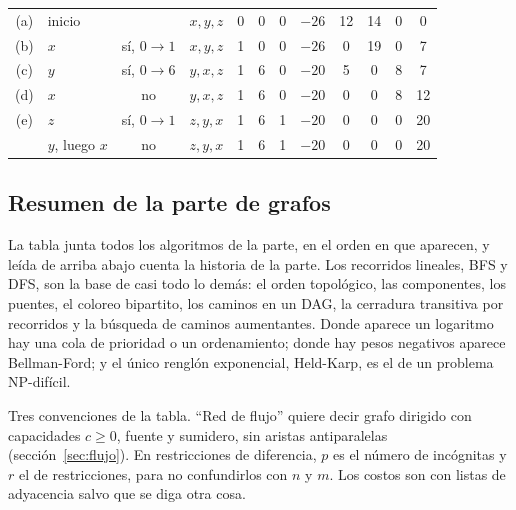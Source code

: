 \documentclass[11pt,letterpaper]{article}
\begin{document}
\begin{ejemplo}
\begin{center}
\begin{tabular}{clcccccccccc}
    \midrule
    (a) & inicio & & $x, y, z$ & 0 & 0 & 0 & $-26$ & 12 & 14 & 0 & 0 \\
    (b) & $x$ & sí, $0 \to 1$ & $x, y, z$ & 1 & 0 & 0 & $-26$ & 0 & 19
        & 0 & 7 \\
    (c) & $y$ & sí, $0 \to 6$ & $y, x, z$ & 1 & 6 & 0 & $-20$ & 5 & 0
        & 8 & 7 \\
    (d) & $x$ & no & $y, x, z$ & 1 & 6 & 0 & $-20$ & 0 & 0 & 8 & 12 \\
    (e) & $z$ & sí, $0 \to 1$ & $z, y, x$ & 1 & 6 & 1 & $-20$ & 0 & 0
        & 0 & 20 \\
    & $y$, luego $x$ & no & $z, y, x$ & 1 & 6 & 1 & $-20$ & 0 & 0 & 0
        & 20 \\
    \bottomrule
  \end{tabular}
  \end{center}
\end{ejemplo}


\subsection*{Resumen de la parte de grafos}

La tabla junta todos los algoritmos de la parte, en el orden en que
aparecen, y leída de arriba abajo cuenta la historia de la parte. Los
recorridos lineales, BFS y DFS, son la base de casi todo lo demás: el
orden topológico, las componentes, los puentes, el coloreo bipartito,
los caminos en un DAG, la cerradura transitiva por recorridos y la
búsqueda de caminos aumentantes. Donde aparece un logaritmo hay una
cola de prioridad o un ordenamiento; donde hay pesos negativos aparece
Bellman-Ford; y el único renglón exponencial, Held-Karp, es el de un
problema NP-difícil.

Tres convenciones de la tabla. ``Red de flujo'' quiere decir grafo
dirigido con capacidades $c \ge 0$, fuente y sumidero, sin aristas
antiparalelas (sección~\ref{sec:flujo}). En restricciones de
diferencia, $p$ es el número de incógnitas y $r$ el de restricciones,
para no confundirlos con $n$ y $m$. Los costos son con listas de
adyacencia salvo que se diga otra cosa.
\end{document}
